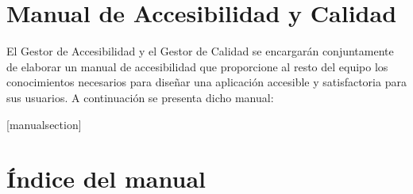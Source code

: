 \newpage
\section{Manual de Accesibilidad y Calidad}

El Gestor de Accesibilidad y el Gestor de Calidad se encargarán conjuntamente de elaborar un manual de accesibilidad que proporcione al resto del equipo los conocimientos necesarios para diseñar una aplicación accesible y satisfactoria para sus usuarios. A continuación se presenta dicho manual:

\begingroup
\makeatletter
{}
[manualsection]
\renewcommand{\themanualsection}{\arabic{manualsection}}
\renewcommand{\themanualsubsection}{\themanualsection.\arabic{manualsubsection}}
\providecommand{\theHmanualsection}{}
\providecommand{\theHmanualsubsection}{}
\renewcommand{\theHmanualsection}{manual.\arabic{manualsection}}
\renewcommand{\theHmanualsubsection}{manual.\arabic{manualsection}.\arabic{manualsubsection}}

\newcommand{\l@manualsection}{\@dottedtocline{1}{0em}{2.3em}}
\newcommand{\l@manualsubsection}{\@dottedtocline{2}{1.5em}{3.2em}}

\section*{Índice del manual}
\begingroup
\renewcommand{\normalcolor}{\color{cambioActivo}}
\endgroup

\renewcommand{\section}[1]{%
  \refstepcounter{manualsection}%
  \setcounter{manualsubsection}{0}%
  \addcontentsline{mtoc}{manualsection}{\protect\numberline{\themanualsection}#1}%
  \par\addvspace{14pt}%
  \noindent{\color{cambioActivo}\sffamily\LARGE\bfseries\themanualsection.\ #1\par}%
  \vspace{6pt}\noindent{\color{cambioActivo}\rule{\linewidth}{0.4pt}}\par\vspace{6pt}%
}
\renewcommand{\subsection}[1]{%
  \refstepcounter{manualsubsection}%
  \addcontentsline{mtoc}{manualsubsection}{\protect\numberline{\themanualsubsection}#1}%
  \par\addvspace{10pt}%
  \noindent{\color{cambioActivo}\sffamily\Large\bfseries\themanualsubsection.\ #1\par}%
  \vspace{4pt}%
}

